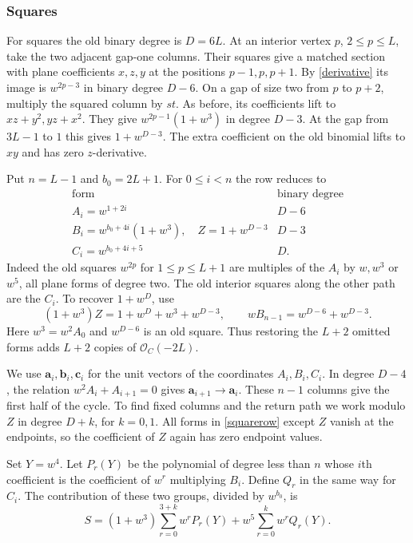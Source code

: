 \documentclass[11pt,a4paper,reqno]{amsart}
\numberwithin{equation}{section}
\theoremstyle{plain}
\newcommand{\OO}{\mathcal O}
\begin{document}
\subsubsection{Squares}\label{sec:square}
For squares the old binary degree is $D=6L$. At an interior vertex $p$, $2\le p\le L$, take the two adjacent gap-one columns. Their squares give a matched section with plane coefficients $x,z,y$ at the positions $p-1,p,p+1$. By \eqref{derivative} its image is $w^{2p-3}$ in binary degree $D-6$. On a gap of size two from $p$ to $p+2$, multiply the squared column by $st$. As before, its coefficients lift to $xz+y^2,yz+x^2$. They give $w^{2p-1}(1+w^3)$ in degree $D-3$. At the gap from $3L-1$ to $1$ this gives $1+w^{D-3}$. The extra coefficient on the old binomial lifts to $xy$ and has zero $z$-derivative.

Put $n=L-1$ and $b_0=2L+1$. For $0\le i<n$ the row reduces to
\begin{equation}\label{squarerow}
\begin{array}{c|c}
 \text{form}&\text{binary degree}\\ \hline
 A_i=w^{1+2i}&D-6\\
 B_i=w^{b_0+4i}(1+w^3),\quad Z=1+w^{D-3}&D-3\\
 C_i=w^{b_0+4i+5}&D .
\end{array}
\end{equation}
Indeed the old squares $w^{2p}$ for $1\le p\le L+1$ are multiples of the $A_i$ by $w,w^3$ or $w^5$, all plane forms of degree two. The old interior squares along the other path are the $C_i$. To recover $1+w^D$, use
\[
 (1+w^3)Z=1+w^D+w^3+w^{D-3},\qquad
 wB_{n-1}=w^{D-6}+w^{D-3}.
\]
Here $w^3=w^2 A_0$ and $w^{D-6}$ is an old square. Thus restoring the $L+2$ omitted forms adds $L+2$ copies of $\OO_C(-2L)$.

We use $\mathbf a_i,\mathbf b_i,\mathbf c_i$ for the unit vectors of the coordinates $A_i,B_i,C_i$. In degree $D-4$, the relation $w^2A_i+A_{i+1}=0$ gives $\mathbf a_{i+1}\to\mathbf a_i$. These $n-1$ columns give the first half of the cycle. To find fixed columns and the return path we work modulo $Z$ in degree $D+k$, for $k=0,1$. All forms in \eqref{squarerow} except $Z$ vanish at the endpoints, so the coefficient of $Z$ again has zero endpoint values.

Set $Y=w^4$. Let $P_r(Y)$ be the polynomial of degree less than $n$ whose $i$th coefficient is the coefficient of $w^r$ multiplying $B_i$. Define $Q_r$ in the same way for $C_i$. The contribution of these two groups, divided by $w^{b_0}$, is
\begin{equation}\label{squarearray}
 S=(1+w^3)\sum_{r=0}^{3+k}w^r P_r(Y)+w^5\sum_{r=0}^k w^r Q_r(Y).
\end{equation}
\end{document}
